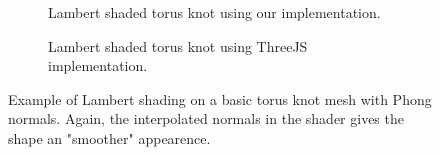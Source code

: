 \documentclass[10pt,twocolumn,letterpaper]{article}
\begin{document}
\begin{figure}
    \centering
    \begin{subfigure}{.48\linewidth}
        \caption{Lambert shaded torus knot using our implementation.}
        \label{fig:our-lambert-tk}
    \end{subfigure}
    \hfill
    \begin{subfigure}{.48\linewidth}
        \caption{Lambert shaded torus knot using ThreeJS implementation.}
        \label{fig:three-lambert-tk}
    \end{subfigure}
    \caption{Example of Lambert shading on a basic torus knot mesh with Phong normals. Again, the interpolated normals in the shader gives the shape an "smoother" appearence.}
    \label{fig:lambert-tk}
\end{figure}
\end{document}
